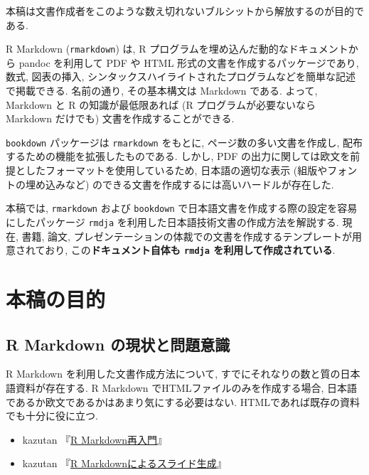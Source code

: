 \documentclass[
]{bxjsbook}
\providecommand{\tightlist}{%
  \setlength{\itemsep}{0pt}\setlength{\parskip}{0pt}}
\theoremstyle{definition}
\theoremstyle{definition}
\theoremstyle{definition}
\theoremstyle{remark}
\begin{document}
本稿は文書作成者をこのような数え切れないブルシットから解放するのが目的である.

R Markdown (\texttt{rmarkdown}) は, R
プログラムを埋め込んだ動的なドキュメントから pandoc を利用して PDF や
HTML 形式の文書を作成するパッケージであり, 数式, 図表の挿入,
シンタックスハイライトされたプログラムなどを簡単な記述で掲載できる.
名前の通り, その基本構文は Markdown である. よって, Markdown と R
の知識が最低限あれば (R プログラムが必要ないなら Markdown だけでも)
文書を作成することができる.

\texttt{bookdown} パッケージは \texttt{rmarkdown} をもとに,
ページ数の多い文書を作成し, 配布するための機能を拡張したものである.
しかし, PDF
の出力に関しては欧文を前提としたフォーマットを使用しているため,
日本語の適切な表示 (組版やフォントの埋め込みなど)
のできる文書を作成するには高いハードルが存在した.

本稿では, \texttt{rmarkdown} および \texttt{bookdown}
で日本語文書を作成する際の設定を容易にしたパッケージ \texttt{rmdja}
を利用した日本語技術文書の作成方法を解説する. 現在, 書籍, 論文,
プレゼンテーションの体裁での文書を作成するテンプレートが用意されており,
この\textbf{ドキュメント自体も \texttt{rmdja} を利用して作成されている}.

\hypertarget{ux672cux7a3fux306eux76eeux7684}{%
\chapter*{本稿の目的}\label{ux672cux7a3fux306eux76eeux7684}}

\hypertarget{r-markdown-ux306eux73feux72b6ux3068ux554fux984cux610fux8b58}{%
\section*{R Markdown
の現状と問題意識}\label{r-markdown-ux306eux73feux72b6ux3068ux554fux984cux610fux8b58}}

R Markdown を利用した文書作成方法について,
すでにそれなりの数と質の日本語資料が存在する. R Markdown
でHTMLファイルのみを作成する場合,
日本語であるか欧文であるかはあまり気にする必要はない.
HTMLであれば既存の資料でも十分に役に立つ.

\begin{itemize}
\tightlist
\item
  kazutan
  『\href{https://kazutan.github.io/fukuokaR11/intro_rmarkdown_d.html}{R
  Markdown再入門}』
\item
  kazutan
  『\href{https://kazutan.github.io/SappoRoR6/rmd_slide.html\#/}{R
  Markdownによるスライド生成}』
\end{itemize}
\end{document}
